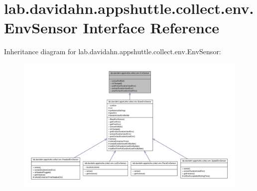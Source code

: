 \hypertarget{interfacelab_1_1davidahn_1_1appshuttle_1_1collect_1_1env_1_1_env_sensor}{\section{lab.\-davidahn.\-appshuttle.\-collect.\-env.\-Env\-Sensor \-Interface \-Reference}
\label{interfacelab_1_1davidahn_1_1appshuttle_1_1collect_1_1env_1_1_env_sensor}
}


\-Inheritance diagram for lab.\-davidahn.\-appshuttle.\-collect.\-env.\-Env\-Sensor\-:
\nopagebreak
\begin{figure}[H]
\begin{center}
\leavevmode
\includegraphics[width=350pt]{interfacelab_1_1davidahn_1_1appshuttle_1_1collect_1_1env_1_1_env_sensor__inherit__graph}
\end{center}
\end{figure}
